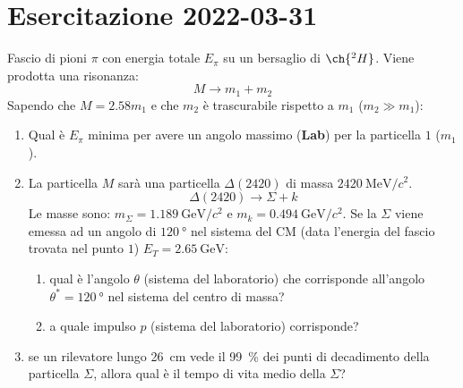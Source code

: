\chapter{Esercitazione 2022-03-31}
\begin{example}[]
	Fascio di pioni $\pi$ con energia totale $E _{\pi}$ su un bersaglio di
	$\ch{^{2}H}$. Viene prodotta una risonanza:
	\begin{equation}
		M \rightarrow m_1 + m_2
	\end{equation}
	Sapendo che $M = 2.58 m_1$ e che $m_2$ è trascurabile rispetto a $m_1$ ($m_2
		\gg m_1$):
	\begin{enumerate}
		\item Qual è $E _{\pi}$ minima per avere un angolo massimo (\textbf{Lab})
		      per la particella $1$ ($m_1$).
		\item La particella $M$ sarà una particella $\Delta (2420)$ di massa
		      $\qty{2420}{\MeV \per c^2}$.
		      \begin{equation}
			      \Delta (2420) \rightarrow \Sigma + k
		      \end{equation}
		      Le masse sono: $m _{\Sigma} = \qty{1.189}{\GeV \per c^2}$ e $m _{k} =
			      \qty{0.494}{\GeV \per c^2}$.
		      Se la $\Sigma$ viene emessa ad un angolo di $\qty{120}{\degree}$ nel
		      sistema del CM (data l'energia del fascio trovata nel punto $1$) $E
				      _{T} = \qty{2.65}{\GeV}$:
		      \begin{enumerate}
			      \item qual è l'angolo $\theta$ (sistema del laboratorio) che
			            corrisponde all'angolo $\theta^\ast = \qty{120}{\degree}$ nel
			            sistema del centro di massa?
			      \item a quale impulso $p$ (sistema del laboratorio) corrisponde?
		      \end{enumerate}
		\item se un rilevatore lungo \qty{26}{\cm} vede il \qty{99}{\%} dei punti
		      di decadimento della particella $\Sigma$, allora qual è il tempo di
		      vita medio della $\Sigma$?
	\end{enumerate}


\end{example}
